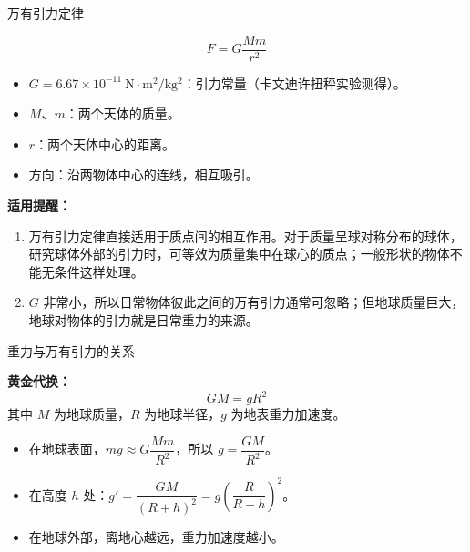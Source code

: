 \begin{conceptbox}{万有引力定律}

\[
\boxed{F = G\frac{Mm}{r^2}}
\]

\begin{itemize}
  \item $G = 6.67 \times 10^{-11}\ \mathrm{N \cdot m^2 / kg^2}$：引力常量（卡文迪许扭秤实验测得）。
  \item $M$、$m$：两个天体的质量。
  \item $r$：两个天体中心的距离。
  \item 方向：沿两物体中心的连线，相互吸引。
\end{itemize}

\begin{center}


\label{fig:gravity-law}
\end{center}

\textbf{适用提醒：}
\begin{enumerate}
  \item 万有引力定律直接适用于质点间的相互作用。对于质量呈球对称分布的球体，研究球体外部的引力时，可等效为质量集中在球心的质点；一般形状的物体不能无条件这样处理。
  \item $G$ 非常小，所以日常物体彼此之间的万有引力通常可忽略；但地球质量巨大，地球对物体的引力就是日常重力的来源。
\end{enumerate}

\end{conceptbox}

\begin{conceptbox}{重力与万有引力的关系}

\begin{center}


\label{fig:gravity-surface}
\end{center}

\textbf{黄金代换：}
\[
\boxed{GM = gR^2}
\]
其中 $M$ 为地球质量，$R$ 为地球半径，$g$ 为地表重力加速度。

\begin{itemize}
  \item 在地球表面，$mg \approx G\dfrac{Mm}{R^2}$，所以 $g = \dfrac{GM}{R^2}$。
  \item 在高度 $h$ 处：$g' = \dfrac{GM}{(R+h)^2} = g\left(\dfrac{R}{R+h}\right)^2$。
  \item 在地球外部，离地心越远，重力加速度越小。
\end{itemize}

\end{conceptbox}

